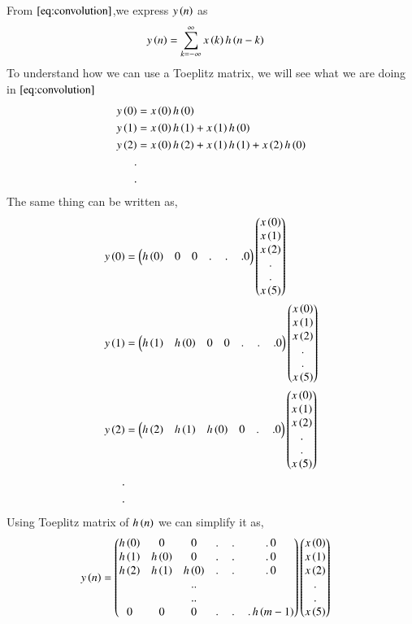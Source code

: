 \documentclass[journal,12pt,twocolumn]{IEEEtran}
\renewcommand\thesection{\arabic{section}}
\begin{document}
\begin{enumerate}[label=\thesection.\arabic*]
	From $\eqref{eq:convolution}$,we express $y\left(n\right)$ as
	\begin{align}
		y\left(n\right) &= \sum_{k = -\infty}^{\infty}x\left(k\right)h\left(n-k\right)
	\end{align}
	To understand how we can use a Toeplitz matrix, we will see what we are doing in $\eqref{eq:convolution}$ 
	\begin{align}
		y\left(0\right) &= x\left(0\right)h\left(0\right)\\
		y\left(1\right) &= x\left(0\right)h\left(1\right) + x\left(1\right)h\left(0\right)\\
		y\left(2\right) &= x\left(0\right)h\left(2\right) + x\left(1\right)h\left(1\right) + x\left(2\right)h\left(0\right)\\
		. \nonumber&\\ 
		.& \nonumber
	\end{align}
	The same thing can be written as,
	\begin{align}
		y\left(0\right) &= \begin{pmatrix}h\left(0\right) & 0 & 0 &.\,&.\,&.0\end{pmatrix}\begin{pmatrix}x\left(0\right)\\x\left(1\right)\\x\left(2\right)\\ . \\.\\x\left(5\right)\end{pmatrix}\\
		y\left(1\right) &= \begin{pmatrix}h\left(1\right) & h\left(0\right) & 0 & 0 &.\,&.\,&.0\end{pmatrix}\begin{pmatrix}x\left(0\right)\\x\left(1\right)\\x\left(2\right)\\ . \\.\\x\left(5\right)\end{pmatrix}\\
		y\left(2\right) &= \begin{pmatrix}h\left(2\right) & h\left(1\right) & h\left(0\right) & 0& .\,&.0\end{pmatrix}\begin{pmatrix}x\left(0\right)\\x\left(1\right)\\x\left(2\right)\\ . \\.\\x\left(5\right)\end{pmatrix}\\
		. & \nonumber \\
		.& \nonumber
	\end{align}
	Using Toeplitz matrix of $h\left(n\right)$ we can simplify it as,
	\begin{align}
		y\brak{n} &= \myvec{h\brak{0} & 0 & 0 &.\,&.\,&.\,0 \\
			h\brak{1} & h\brak{0} & 0 & .\,&.\,&.\,0 \\
			h\brak{2} & h\brak{1} & h\brak{0} & .\,&.\,&.\,0 \\
			&&..\\&&..\\ 0 & 0 &  0 &.\,&.\,&.\, h\brak{m-1}}\myvec{x\brak{0}\\x\brak{1}\\x\brak{2}\\ . \\.\\x\brak{5}}\label{eq:5.9}

\end{align}
\end{enumerate}
\end{document}

